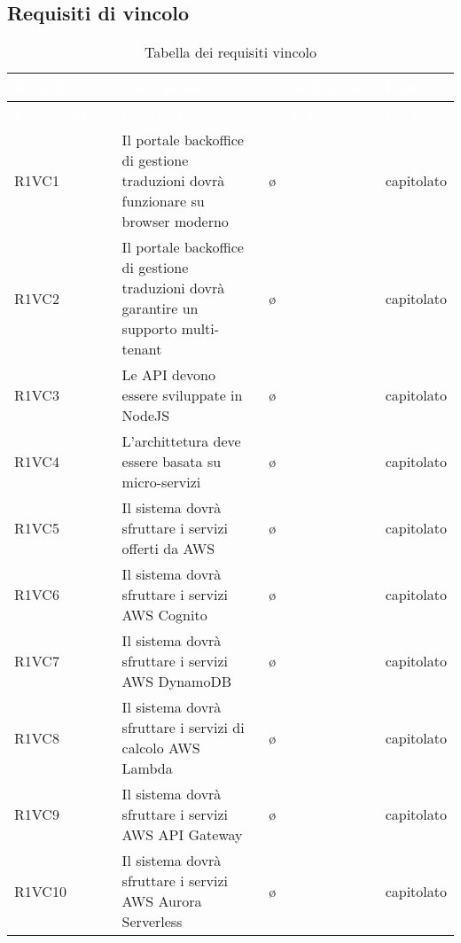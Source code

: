{\begin{longtable}{ l p{7cm} l p{3cm}}
        \end{longtable}
        
    }


\subsection{Requisiti di vincolo}
        \renewcommand{\arraystretch}{1.5}
        
        \begin{longtable}{ l p{7cm} l p{3cm}}
            \caption{Tabella dei requisiti vincolo}\\
            \rowcolor{darkblue}
            \textcolor{white}{Identificativo} & \textcolor{white}{Descrizione} & \textcolor{white}{Classificazione} & \textcolor{white}{Fonti}\\	
            \endfirsthead
            \rowcolor{darkblue}
            \textcolor{white}{Identificativo} & \textcolor{white}{Descrizione} & \textcolor{white}{Classificazione} & \textcolor{white}{Fonti}\\
            \endhead
            R1VC1 & Il portale backoffice di gestione traduzioni dovrà funzionare su browser moderno & \o & capitolato\\
            R1VC2 & Il portale backoffice di gestione traduzioni dovrà garantire un supporto multi-tenant & \o & capitolato\\
            R1VC3 & Le API devono essere sviluppate in NodeJS & \o & capitolato\\
            R1VC4 & L'archittetura deve essere basata su micro-servizi & \o & capitolato\\
            R1VC5 & Il sistema dovrà sfruttare i servizi offerti da AWS & \o & capitolato\\
            R1VC6 & Il sistema dovrà sfruttare i servizi AWS Cognito & \o & capitolato\\
            R1VC7 & Il sistema dovrà sfruttare i servizi AWS DynamoDB & \o & capitolato\\
            R1VC8 & Il sistema dovrà sfruttare i servizi di calcolo AWS Lambda & \o & capitolato\\
            R1VC9 & Il sistema dovrà sfruttare i servizi AWS API Gateway & \o & capitolato\\
            R1VC10 & Il sistema dovrà sfruttare i servizi AWS Aurora Serverless & \o & capitolato\\
        \end{longtable}
